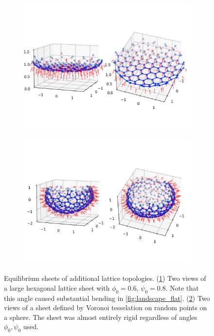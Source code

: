 \begin{figure}[bhtp]
	\centering
	\begin{subfigure}[b]{0.48\textwidth}
		\centering
		\includegraphics[width=\textwidth]{hexbig.png}
		\caption{}
		\label{subfig:hexbig}
	\end{subfigure}
	\begin{subfigure}[b]{0.48\textwidth}
		\centering
		\includegraphics[width=\textwidth]{sphere.png}
		\caption{}
		\label{subfig:sphere}
	\end{subfigure}
	\caption[Equilibrium sheets of other lattice topologies]{Equilibrium sheets of additional lattice topologies. (\ref{subfig:hexbig}) Two views of a large hexagonal lattice sheet with $\phi_0 = 0.6$, $\psi_0 = 0.8$. Note that this angle caused substantial bending in \cref{fig:landscape_flat}. (\ref{subfig:sphere}) Two views of a sheet defined by Voronoi tesselation on random points on a sphere. The sheet was almost entirely rigid regardless of angles $\phi_0, \psi_0$ used.}
	\label{fig:extra}
\end{figure}

